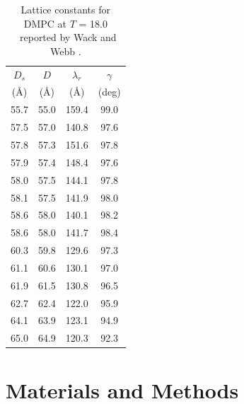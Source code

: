 \begin{table}
\centering
  \begin{tabular}{cccc}
    \hline
    $D_s$ & $D$ & $\lambda_r$ & $\gamma$ \\
    (\AA) & (\AA) & (\AA) & (deg) \\
    \hline
    55.7 & 55.0 & 159.4 & 99.0 \\
    57.5 & 57.0 & 140.8 & 97.6 \\
    57.8 & 57.3 & 151.6 & 97.8 \\
    57.9 & 57.4 & 148.4 & 97.6 \\
    58.0 & 57.5	& 144.1 & 97.8 \\
    58.1 & 57.5 & 141.9 & 98.0 \\
    58.6 & 58.0 & 140.1 & 98.2 \\
    58.6 & 58.0 & 141.7 & 98.4 \\
    60.3 & 59.8 & 129.6 & 97.3 \\
    61.1 & 60.6 & 130.1 & 97.0 \\
    61.9 & 61.5 & 130.8 & 96.5 \\
    62.7 & 62.4 & 122.0 & 95.9 \\
    64.1 & 63.9 & 123.1 & 94.9 \\
    65.0 & 64.9 & 120.3 & 92.3 \\    
    \hline 
  \end{tabular}
  \caption{Lattice constants for DMPC at $T$ = 18.0 \textcelsius\
  reported by Wack and Webb \cite{ref:Wack89}.} 
\end{table}

\section{Materials and Methods}
